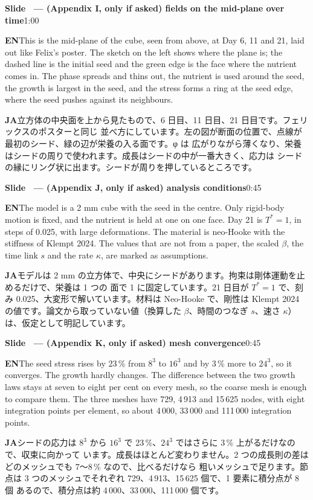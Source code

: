 \documentclass[11pt,a4paper]{article}
\newcounter{sl}
\newcommand{\slide}[2]{\stepcounter{sl}\vspace{8pt}%
  {\color{c3}\large\bfseries Slide \thesl\ --- #1}\hfill{\small #2}\par\vspace{2pt}}
\newcommand{\EN}{\textbf{EN}\quad}
\newcommand{\JA}{\par\textbf{JA}\quad}
\begin{document}
\slide{(Appendix I, only if asked) fields on the mid-plane over time}{1:00}
\EN This is the mid-plane of the cube, seen from above, at Day 6, 11 and 21,
laid out like Felix's poster. The sketch on the left shows where the plane
is; the dashed line is the initial seed and the green edge is the face where
the nutrient comes in. The phase spreads and thins out, the nutrient is used
around the seed, the growth is largest in the seed, and the stress forms a
ring at the seed edge, where the seed pushes against its neighbours.
\JA 立方体の中央面を上から見たもので、6 日目、11 日目、21 日目です。フェリックスのポスターと同じ
並べ方にしています。左の図が断面の位置で、点線が最初のシード、緑の辺が栄養の入る面です。φ は
広がりながら薄くなり、栄養はシードの周りで使われます。成長はシードの中が一番大きく、応力は
シードの縁にリング状に出ます。シードが周りを押しているところです。

\slide{(Appendix J, only if asked) analysis conditions}{0:45}
\EN The model is a 2 mm cube with the seed in the centre. Only rigid-body
motion is fixed, and the nutrient is held at one on one face. Day 21 is
$T^*=1$, in steps of 0.025, with large deformations. The material is neo-Hooke
with the stiffness of Klempt 2024. The values that are not from a paper,
the scaled $\beta$, the time link $s$ and the rate $\kappa$, are marked as
assumptions.
\JA モデルは 2 mm の立方体で、中央にシードがあります。拘束は剛体運動を止めるだけで、栄養は 1 つの
面で 1 に固定しています。21 日目が $T^*=1$ で、刻み 0.025、大変形で解いています。材料は
Neo-Hooke で、剛性は Klempt 2024 の値です。論文から取っていない値（換算した $\beta$、時間のつなぎ
$s$、速さ $\kappa$）は、仮定として明記しています。

\slide{(Appendix K, only if asked) mesh convergence}{0:45}
\EN The seed stress rises by 23\,\% from $8^3$ to $16^3$ and by 3\,\% more to
$24^3$, so it converges. The growth hardly changes. The difference between
the two growth laws stays at seven to eight per cent on every mesh, so the
coarse mesh is enough to compare them. The three meshes have 729, 4\,913
and 15\,625 nodes, with eight integration points per element, so about
4\,000, 33\,000 and 111\,000 integration points.
\JA シードの応力は $8^3$ から $16^3$ で 23\,\%、$24^3$ ではさらに 3\,\% 上がるだけなので、収束に向かって
います。成長はほとんど変わりません。2 つの成長則の差はどのメッシュでも 7〜8\,\% なので、比べるだけなら
粗いメッシュで足ります。節点は 3 つのメッシュでそれぞれ 729、4\,913、15\,625 個で、1 要素に積分点が 8 個
あるので、積分点は約 4\,000、33\,000、111\,000 個です。
\end{document}
